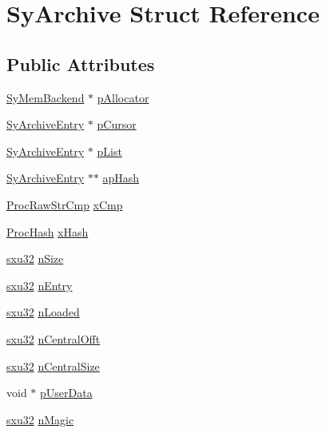 \hypertarget{struct_sy_archive}{\section{Sy\-Archive Struct Reference}
\label{dd/d4c/struct_sy_archive}
}
\subsection*{Public Attributes}
\begin{DoxyCompactItemize}
\item 
\hyperlink{struct_sy_mem_backend}{Sy\-Mem\-Backend} $\ast$ \hyperlink{struct_sy_archive_ab56c1aa19fecdfdbbbfeafbb0d5e918f}{p\-Allocator}
\item 
\hyperlink{struct_sy_archive_entry}{Sy\-Archive\-Entry} $\ast$ \hyperlink{struct_sy_archive_a858b66a2d80265e10c1857e8bd666e62}{p\-Cursor}
\item 
\hyperlink{struct_sy_archive_entry}{Sy\-Archive\-Entry} $\ast$ \hyperlink{struct_sy_archive_aa7574e2329f5f05d9ec6af5f69409cda}{p\-List}
\item 
\hyperlink{struct_sy_archive_entry}{Sy\-Archive\-Entry} $\ast$$\ast$ \hyperlink{struct_sy_archive_a284e6d5eb3c8da3b74e18f48b18456fe}{ap\-Hash}
\item 
\hyperlink{unqlite_8c_a92f6cc7c70fa39ad2c6790923471db6f}{Proc\-Raw\-Str\-Cmp} \hyperlink{struct_sy_archive_a389b0f0d0630003065e9c51ef9f12e6f}{x\-Cmp}
\item 
\hyperlink{unqlite_8c_a38d523bbe0ae0e849597c37b22bfe806}{Proc\-Hash} \hyperlink{struct_sy_archive_aab26c7c49101a068f76755fd35f98eea}{x\-Hash}
\item 
\hyperlink{unqlite_8c_abc5a8a3f345c200c98c485551f49666e}{sxu32} \hyperlink{struct_sy_archive_a6d06f8a01e970d14109e247b8eee3e86}{n\-Size}
\item 
\hyperlink{unqlite_8c_abc5a8a3f345c200c98c485551f49666e}{sxu32} \hyperlink{struct_sy_archive_a870e191dc2fdb9b904eccef04bc5c940}{n\-Entry}
\item 
\hyperlink{unqlite_8c_abc5a8a3f345c200c98c485551f49666e}{sxu32} \hyperlink{struct_sy_archive_ab357148740292e6c13a0fafd47188589}{n\-Loaded}
\item 
\hyperlink{unqlite_8c_abc5a8a3f345c200c98c485551f49666e}{sxu32} \hyperlink{struct_sy_archive_a3b061b0e6658501f80738f9ad728dd24}{n\-Central\-Offt}
\item 
\hyperlink{unqlite_8c_abc5a8a3f345c200c98c485551f49666e}{sxu32} \hyperlink{struct_sy_archive_ab4f232e7f54707c10ea541a94dd14a1b}{n\-Central\-Size}
\item 
void $\ast$ \hyperlink{struct_sy_archive_a691fbabbae2106085dab1b866197100f}{p\-User\-Data}
\item 
\hyperlink{unqlite_8c_abc5a8a3f345c200c98c485551f49666e}{sxu32} \hyperlink{struct_sy_archive_ab8ab98ea425b9375bd30d8da31da31b6}{n\-Magic}
\end{DoxyCompactItemize}



